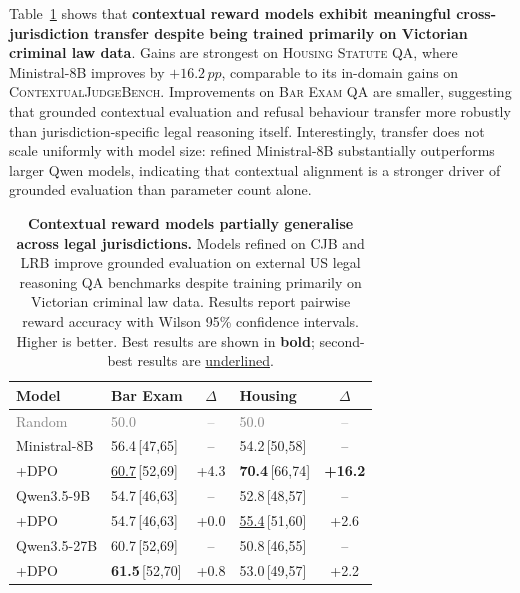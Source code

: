 \documentclass{article}
\newcommand{\pp}{\,pp}
\theoremstyle{plain}
\theoremstyle{definition}
\theoremstyle{remark}
\begin{document}
Table~\ref{tab:cross-domain} shows that \textbf{contextual reward models exhibit meaningful cross-jurisdiction transfer despite being trained primarily on Victorian criminal law data}. Gains are strongest on \textsc{Housing Statute QA}, where Ministral-8B improves by $+16.2\pp$, comparable to its in-domain gains on \textsc{ContextualJudgeBench}. Improvements on \textsc{Bar Exam QA} are smaller, suggesting that grounded contextual evaluation and refusal behaviour transfer more robustly than jurisdiction-specific legal reasoning itself. Interestingly, transfer does not scale uniformly with model size: refined Ministral-8B substantially outperforms larger Qwen models, indicating that contextual alignment is a stronger driver of grounded evaluation than parameter count alone.

\begin{table}[t!]
\centering
\caption{
\textbf{Contextual reward models partially generalise across legal jurisdictions.}
Models refined on CJB and LRB improve grounded evaluation on external US legal reasoning QA benchmarks despite training primarily on Victorian criminal law data. Results report pairwise reward accuracy with Wilson 95\% confidence intervals. Higher is better. Best results are shown in \textbf{bold}; second-best results are \underline{underlined}.
}
\label{tab:cross-domain}
\smallskip
\small
\setlength{\tabcolsep}{3.5pt}
\begin{tabular}{llclc}
\toprule
\textbf{Model} & \textbf{Bar Exam} & $\Delta$ & \textbf{Housing} & $\Delta$ \\
\midrule

\textcolor{gray}{Random}
& \textcolor{gray}{50.0}
& \textcolor{gray}{--}
& \textcolor{gray}{50.0}
& \textcolor{gray}{--} \\

\midrule
Ministral-8B
& 56.4\,\tiny{[47,65]}
& --
& 54.2\,\tiny{[50,58]}
& -- \\

\quad +DPO
& \underline{60.7}\,\tiny{[52,69]}
& +4.3
& \cellcolor{PrimaryGold!30}\textbf{70.4}\,\tiny{[66,74]}
& \cellcolor{PrimaryGold!30}\textbf{+16.2} \\

\midrule
Qwen3.5-9B
& 54.7\,\tiny{[46,63]}
& --
& 52.8\,\tiny{[48,57]}
& -- \\

\quad +DPO
& 54.7\,\tiny{[46,63]}
& +0.0
& \underline{55.4}\,\tiny{[51,60]}
& +2.6 \\

\midrule
Qwen3.5-27B
& 60.7\,\tiny{[52,69]}
& --
& 50.8\,\tiny{[46,55]}
& -- \\

\quad +DPO
& \textbf{61.5}\,\tiny{[52,70]}
& +0.8
& 53.0\,\tiny{[49,57]}
& +2.2 \\

\bottomrule
\end{tabular}
\end{table}
\end{document}
